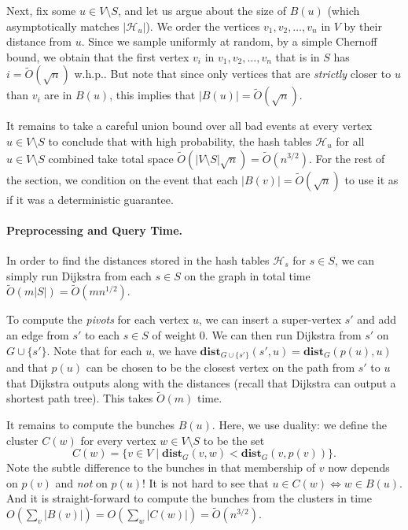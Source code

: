 Next, fix some $u \in V \setminus S$, and let us argue about the size of $B(u)$ (which asymptotically matches $|\mathcal{H}_u|$). We order the vertices $v_1, v_2, \dots, v_n$ in $V$ by their distance from $u$. Since we sample uniformly at random, by a simple Chernoff bound, we obtain that the first vertex $v_i$ in $v_1, v_2, \dots, v_n$ that is in $S$ has $i = \tilde{O}(\sqrt{n})$ w.h.p.. But note that since only vertices that are \emph{strictly} closer to $u$ than $v_i$ are in $B(u)$, this implies that $|B(u)| = \tilde{O}(\sqrt{n})$.

It remains to take a careful union bound over all bad events at every vertex $u \in V \setminus S$ to conclude that with high probability, the hash tables $\mathcal{H}_u$ for all $u \in V \setminus S$ combined take total space $\tilde{O}(|V \setminus S| \sqrt{n}) = \tilde{O}(n^{3/2})$. For the rest of the section, we condition on the event that each $|B(v)| =\tilde{O}(\sqrt{n})$ to use it as if it was a deterministic guarantee.

\paragraph{Preprocessing and Query Time.} In order to find the distances stored in the hash tables $\mathcal{H}_s$ for $s \in S$, we can simply run Dijkstra from each $s \in S$ on the graph in total time $\tilde{O}(m|S|) = \tilde{O}(mn^{1/2})$.

To compute the \emph{pivots} for each vertex $u$, we can insert a super-vertex $s'$ and add an edge from $s'$ to each $s \in S$ of weight $0$. We can then run Dijkstra from $s'$ on $G \cup \{s'\}$. Note that for each $u$, we have $\mathbf{dist}_{G \cup \{s'\}}(s', u) = \mathbf{dist}_G(p(u),u)$ and that $p(u)$ can be chosen to be the closest vertex on the path from $s'$ to $u$ that Dijkstra outputs along with the distances (recall that Dijkstra can output a shortest path tree). This takes $\tilde{O}(m)$ time.

It remains to compute the bunches $B(u)$. Here, we use duality: we define the cluster $C(w)$ for every vertex $w \in V \setminus S$ to be the set
\[
    C(w) = \{ v \in V \;|\; \mathbf{dist}_G(v,w) < \mathbf{dist}_G(v,p(v))\}.
\]
Note the subtle difference to the bunches in that membership of $v$ now depends on $p(v)$ and \emph{not} on $p(u)$! It is not hard to see that $u \in C(w) \iff w \in B(u)$. And it is straight-forward to compute the bunches from the clusters in time $O(\sum_v |B(v)|) = O(\sum_w |C(w)|) = \tilde{O}(n^{3/2})$. 

